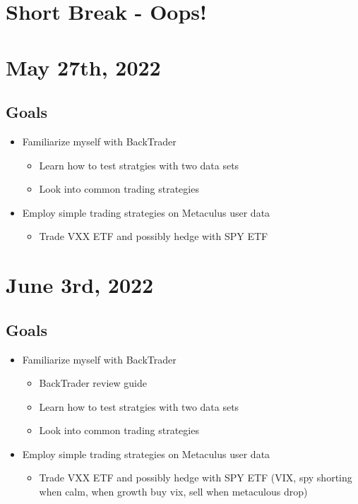 \documentclass{article}
\begin{document}
\section{Short Break - Oops!}

\section{May 27th, 2022}
\subsection*{Goals}
\begin{itemize}
    \item Familiarize myself with BackTrader
    \begin{itemize}
        \item Learn how to test stratgies with two data sets
        \item Look into common trading strategies
    \end{itemize}
    \item Employ simple trading strategies on Metaculus user data 
    \begin{itemize}
        \item Trade VXX ETF and possibly hedge with SPY ETF
    \end{itemize}
\end{itemize}

\section{June 3rd, 2022}
\subsection*{Goals}
\begin{itemize}
    \item Familiarize myself with BackTrader
    \begin{itemize}
        \item BackTrader review guide
        \item Learn how to test stratgies with two data sets
        \item Look into common trading strategies
    \end{itemize}
    \item Employ simple trading strategies on Metaculus user data 
    \begin{itemize}
        \item Trade VXX ETF and possibly hedge with SPY ETF (VIX, spy shorting when calm, when growth buy vix, sell when metaculous drop)
    \end{itemize}
\end{itemize}
\end{document}
